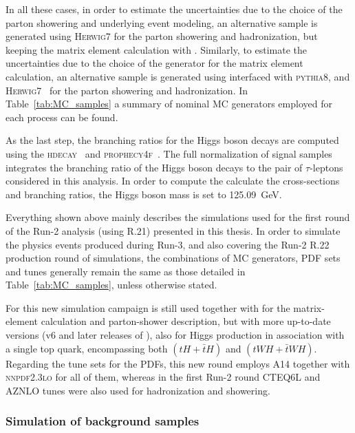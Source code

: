 In all these cases, in order to estimate the uncertainties due to the choice of the parton showering and underlying event modeling, an alternative sample is generated using \textsc{Herwig7} for the parton showering and hadronization, 
but keeping the matrix element calculation with \powheg. Similarly, to estimate the uncertainties due to the choice of the generator for the matrix element calculation,
an alternative sample is generated using \madgraph interfaced with \textsc{pythia8}, and \textsc{Herwig7}~\cite{bellm2017herwig71releasenote} for the parton showering and hadronization.
In Table~\ref{tab:MC_samples} a summary of nominal MC generators employed for each process can be found.

As the last step, the branching ratios for the Higgs boson decays are computed using the \textsc{hdecay}~\cite{Djouadi:1997yw,Spira:1997dg,Djouadi:2006bz} and \textsc{prophecy4f}~\cite{Bredenstein:2006ha,Bredenstein:2006rh,Bredenstein:2006nk}.
The full normalization of signal samples integrates the branching ratio of the Higgs boson decays to the pair of $\tau$-leptons considered in this analysis. In order to compute the calculate the cross-sections and branching ratios, the Higgs boson mass is set to 125.09~GeV.

Everything shown above mainly describes the simulations used for the first round of the Run-2 analysis (using R.21) presented in this thesis. In order to simulate the physics events produced during Run-3, and also covering the Run-2 R.22 production round of simulations, 
the combinations of MC generators, PDF sets and tunes generally remain the same as those detailed in Table~\ref{tab:MC_samples}, unless otherwise stated.

For this new simulation campaign \powheg is still used together with \pythia for the matrix-element calculation and parton-shower description, but with more up-to-date versions (v6 and later releases of ), also for Higgs production in association with a single top quark, encompassing both $(tH + \bar{t}H)$ and $(tWH + \bar{t}WH)$.
Regarding the tune sets for the PDFs, this new round employs A14 together with \textsc{nnpdf2.3lo} for all of them, whereas in the first Run-2 round \textsc{CTEQ6L} and \textsc{AZNLO} tunes were also used for hadronization and showering.

\subsubsection*{Simulation of background samples}

